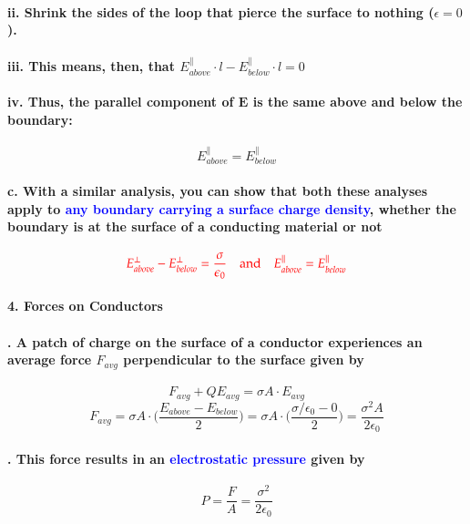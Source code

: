 \documentclass{article}
\begin{document}
\paragraph{\indent\indent ii. Shrink the sides of the loop that pierce the surface to nothing ($\epsilon=0$).}
\paragraph{\indent\indent iii. This means, then, that $E_{above}^{\parallel}\cdot l-E_{below}^{\parallel}\cdot l=0$}
\paragraph{\indent\indent iv. Thus, the parallel component of $\boldsymbol{E}$ is the same above and below the boundary:}
\begin{equation*}
    E_{above}^{\parallel}=E_{below}^{\parallel}
\end{equation*}
\paragraph{\indent c. With a similar analysis, you can show that both these analyses apply to \textcolor{blue}{any boundary carrying a surface charge density}, whether the boundary is at the surface of a conducting material or not}
\begin{equation*}
    \textcolor{red}{ E_{above}^{\perp}-E_{below}^{\perp} =\frac{\sigma}{\epsilon_0}\quad \text{and}\quad E_{above}^{\parallel}=E_{below}^{\parallel}}
\end{equation*}
\paragraph{4. Forces on Conductors}
\paragraph{. A patch of charge on the surface of a conductor experiences an average force $F_{avg}$ perpendicular to the surface given by}
\begin{equation*}
    F_{avg}+QE_{avg}=\sigma A\cdot E_{avg}
\end{equation*}
\begin{equation*}
    F_{avg}=\sigma A\cdot\bigg(\frac{E_{above}-E_{below}}{2}\bigg)=\sigma A\cdot\bigg(\frac{\sigma/\epsilon_0-0}{2}\bigg)=\frac{\sigma^2 A}{2\epsilon_0}
\end{equation*}
\paragraph{. This force results in an \textcolor{blue}{electrostatic pressure} given by}
\begin{equation*}
    P=\frac{F}{A}=\frac{\sigma^2}{2\epsilon_0}
\end{equation*}
\end{document}

